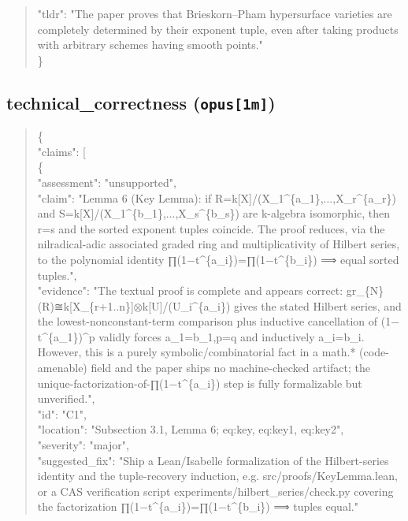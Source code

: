 \documentclass[11pt]{article}
\begin{document}
\begin{quote}
  "tldr": "The paper proves that Brieskorn--Pham hypersurface varieties are completely determined by their exponent tuple, even after taking products with arbitrary schemes having smooth points."\\
\}\\
\end{quote}

\subsection*{technical\_correctness (\texttt{opus[1m]})}
\begin{quote}\small\ttfamily\raggedright
\{\\
  "claims": [\\
    \{\\
      "assessment": "unsupported",\\
      "claim": "Lemma 6 (Key Lemma): if R=k[X]/(X\_1\^{}\{a\_1\},...,X\_r\^{}\{a\_r\}) and S=k[X]/(X\_1\^{}\{b\_1\},...,X\_s\^{}\{b\_s\}) are k-algebra isomorphic, then r=s and the sorted exponent tuples coincide. The proof reduces, via the nilradical-adic associated graded ring and multiplicativity of Hilbert series, to the polynomial identity ∏(1\ensuremath{-}t\^{}\{a\_i\})=∏(1\ensuremath{-}t\^{}\{b\_i\}) ⟹ equal sorted tuples.",\\
      "evidence": "The textual proof is complete and appears correct: gr\_\{N\}(R)≅k[X\_\{r+1..n\}]\ensuremath{\otimes}k[U]/(U\_i\^{}\{a\_i\}) gives the stated Hilbert series, and the lowest-nonconstant-term comparison plus inductive cancellation of (1\ensuremath{-}t\^{}\{a\_1\})\^{}p validly forces a\_1=b\_1,p=q and inductively a\_i=b\_i. However, this is a purely symbolic/combinatorial fact in a math.* (code-amenable) field and the paper ships no machine-checked artifact; the unique-factorization-of-∏(1\ensuremath{-}t\^{}\{a\_i\}) step is fully formalizable but unverified.",\\
      "id": "C1",\\
      "location": "Subsection 3.1, Lemma 6; eq:key, eq:key1, eq:key2",\\
      "severity": "major",\\
      "suggested\_fix": "Ship a Lean/Isabelle formalization of the Hilbert-series identity and the tuple-recovery induction, e.g. src/proofs/KeyLemma.lean, or a CAS verification script experiments/hilbert\_series/check.py covering the factorization ∏(1\ensuremath{-}t\^{}\{a\_i\})=∏(1\ensuremath{-}t\^{}\{b\_i\}) ⟹ tuples equal."\\

\end{quote}
\end{document}

